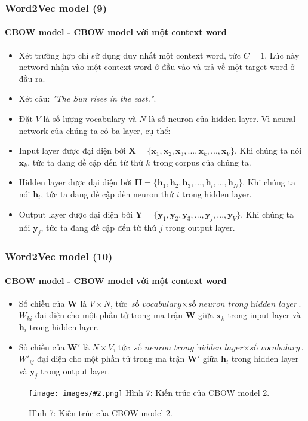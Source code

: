 \documentclass[aspectratio=169]{beamer}
\newcommand{\includeImage}[3]{
\begin{figure}[H]
    \centering
    \texttt{[image: images/\#2.png]}
    \def\temp{#3}\ifx\temp\empty\else\caption{#3}\fi
\end{figure}}
\newcommand{\itemsizePaddingLeft}{\setlength{\itemindent}{0.6cm}}
\begin{document}
\begin{frame}
    \frametitle{Word2Vec model (9)}
    \framesubtitle{CBOW model - CBOW model với một context word}
    \begin{itemize}
            \item Xét trường hợp chỉ sử dụng duy nhất một context word, tức $C = 1$. Lúc này netword nhận vào một context word ở đầu vào và trả về một target word ở đầu ra.
            \item Xét câu: \textsl{"The Sun rises in the east."}.
            \item Đặt $V$ là số lượng vocabulary và $N$ là số neuron của hidden layer. Vì neural network của chúng ta có ba layer, cụ thể:
    \end{itemize}

    \begin{itemize}
        \itemsizePaddingLeft
        \item Input layer được đại diện bởi $\boldsymbol{X} = \{\boldsymbol{x}_1,\boldsymbol{x}_2,\boldsymbol{x}_3,...,\boldsymbol{x}_k,...,\boldsymbol{x}_V \}$. Khi chúng ta nói $\boldsymbol{x}_k$, tức ta đang đề cập đến từ thứ $k$ trong corpus của chúng ta.
        \item Hidden layer được đại diện bởi $\boldsymbol{H} = \{\boldsymbol{h}_1,\boldsymbol{h}_2,\boldsymbol{h}_3,...,\boldsymbol{h}_i,...,\boldsymbol{h}_N \}$. Khi chúng ta nói $\boldsymbol{h}_i$, tức ta đang đề cập đến neuron thứ $i$ trong hidden layer.
        \item Output layer được đại diện bởi $\boldsymbol{Y} = \{\boldsymbol{y}_1,\boldsymbol{y}_2,\boldsymbol{y}_3,...,\boldsymbol{y}_j,...,\boldsymbol{y}_V \}$. Khi chúng ta nói $\boldsymbol{y}_j$, tức ta đang đề cập đến từ thứ $j$ trong output layer.
      \end{itemize}
\end{frame}

\begin{frame}
    \frametitle{Word2Vec model (10)}
    \framesubtitle{CBOW model - CBOW model với một context word}
    \begin{itemize}
            \item Số chiều của $\boldsymbol{W}$ là $V \times N$, tức $\textit{số vocabulary} \times \textit{số neuron trong hidden layer}$. $W_{ki}$ đại diện cho một phần tử trong ma trận $\boldsymbol{W}$ giữa $\boldsymbol{x}_k$ trong input layer và $\boldsymbol{h}_i$ trong hidden layer.
            \item Số chiều của $\boldsymbol{W'}$ là $N \times V$, tức $\textit{số neuron trong hidden layer} \times \textit{số vocabulary}$. $W'_{ij}$ đại diện cho một phần tử trong ma trận $\boldsymbol{W'}$ giữa $\boldsymbol{h}_i$ trong hidden layer và $\boldsymbol{y}_j$ trong output layer.
    \end{itemize}

    \includeImage{0.48}{07}{Hình 7: Kiến trúc của CBOW model 2.}
\end{frame}
\end{document}
